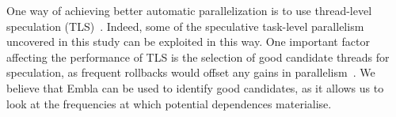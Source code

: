 One way of achieving better automatic parallelization is to use
thread-level speculation (TLS)~\cite{Rundberg01anall-software,
gregory05stampede, welc05safe}.  Indeed, some of the speculative
task-level parallelism uncovered in this study can be exploited in
this way.  One important factor affecting the performance of TLS is
the selection of good candidate threads for speculation, as frequent
rollbacks would offset any gains in parallelism~\cite{johnson04mincut,
liu06posh}.  We believe that Embla can be used to identify good
candidates, as it allows us to look at the frequencies at which
potential dependences materialise.
